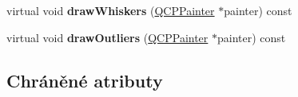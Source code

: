 \begin{DoxyCompactItemize}
\item 
\hypertarget{classQCPStatisticalBox_a6f8d093ec7e404529388d02da4c72b34}{}virtual void {\bfseries draw\+Whiskers} (\hyperlink{classQCPPainter}{Q\+C\+P\+Painter} $\ast$painter) const \label{classQCPStatisticalBox_a6f8d093ec7e404529388d02da4c72b34}

\item 
\hypertarget{classQCPStatisticalBox_a60ebb332a497f51ace837767db5105b9}{}virtual void {\bfseries draw\+Outliers} (\hyperlink{classQCPPainter}{Q\+C\+P\+Painter} $\ast$painter) const \label{classQCPStatisticalBox_a60ebb332a497f51ace837767db5105b9}

\end{DoxyCompactItemize}
\subsection*{Chráněné atributy}
